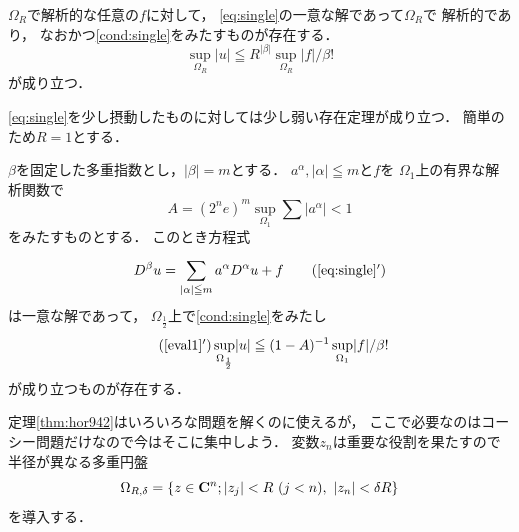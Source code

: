 \begin{LMM}
    \(\Omega_R\)で解析的な任意の\(f\)に対して，
    \eqref{eq:single}の一意な解であって\(\varOmega_R\)で
    解析的であり，
    なおかつ\eqref{cond:single}をみたすものが存在する．
    \begin{equation}\label{eval1}
        \sup_{\varOmega_R}\lvert u\rvert
        \leqq R^{\lvert\beta\rvert}\sup_{\varOmega_R}\lvert f\rvert/\beta!
    \end{equation}
    が成り立つ．
\end{LMM}

\eqref{eq:single}を少し摂動したものに対しては少し弱い存在定理が成り立つ．
簡単のため\(R=1\)とする．

\begin{THM}\label{thm:hor942}
    \(\beta\)を固定した多重指数とし，\(\lvert\beta\rvert=m\)とする．
    \(a^\alpha, \lvert\alpha\rvert\leqq m\)と\(f\)を
    \(\Omega_1\)上の有界な解析関数で
    \[
        A=(2^ne)^m\sup_{\Omega_1}\sum\lvert a^\alpha\rvert<1
    \]
    をみたすものとする．
    このとき方程式
    \begin{equation}
        D^\beta u=\sum_{\lvert\alpha\rvert\leqq m}^{}a^\alpha D^\alpha u+f\tag{\ref{eq:single}$'$}\label{eq:single-1}
    \end{equation}
    は一意な解であって，
    \(\Omega_{\frac{1}{2}}\)上で\eqref{cond:single}をみたし
    \begin{equation}\tag{\ref{eval1}$'$}\label{eval2}
        \sup_{\Omega_\frac{1}{2}}\lvert u\rvert
        \leqq (1-A)^{-1}
        \sup_{\Omega_1}\lvert f\rvert/\beta!
    \end{equation}
    が成り立つものが存在する．
\end{THM}

定理\ref{thm:hor942}はいろいろな問題を解くのに使えるが，
ここで必要なのはコーシー問題だけなので今はそこに集中しよう．
変数\(z_n\)は重要な役割を果たすので半径が異なる多重円盤
\[
    \Omega_{R,\delta}=\{z\in\cc^n;
    \lvert z_j\rvert<R\ (j<n),\ 
    \lvert z_n\rvert<\delta R\}
\]
を導入する．

